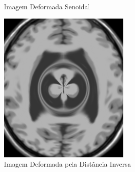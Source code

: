 \documentclass[]{spie}  %
\begin{document}
\begin{figure}[h]
\begin{subfigure}[t]{0.16\textwidth}
	  \caption{Imagem Deformada Senoidal}
	  \label{fig:sin-image}
	\end{subfigure}
	\begin{subfigure}[t]{0.16\textwidth}
	  \includegraphics[width=\textwidth]{../images/movingImageDist.png}
	  \caption{Imagem Deformada pela Distância Inversa}
	  \label{fig:dist-image}
	\end{subfigure}
	\begin{subfigure}[t]{0.16\textwidth}

\end{subfigure}
\end{figure}
\end{document}
